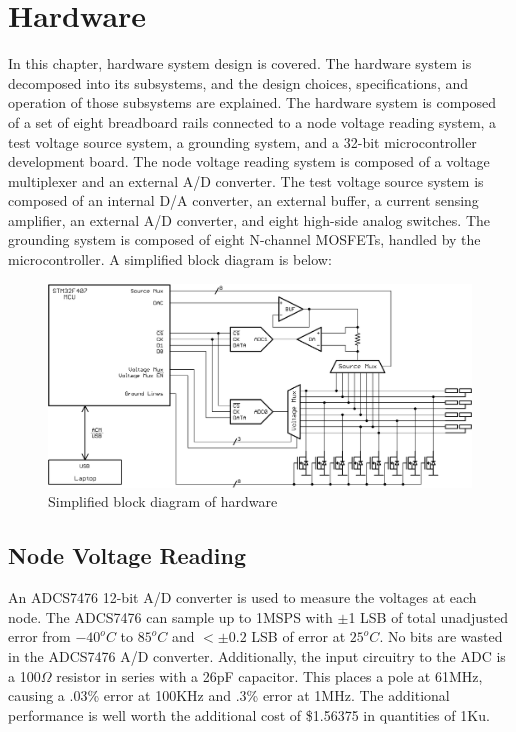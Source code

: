 \documentclass[11pt,twoside]{mitthesis}
\begin{document}
\fi


\chapter{Hardware}
In this chapter, hardware system design is covered.
The hardware system is decomposed into its subsystems, and the design choices, specifications, and operation of those subsystems are explained.
The hardware system is composed of a set of eight breadboard rails connected to a node voltage reading system, a test voltage source system, a grounding system, and a 32-bit microcontroller development board.
The node voltage reading system is composed of a voltage multiplexer and an external A/D converter.
The test voltage source system is composed of an internal D/A converter, an external buffer, a current sensing amplifier, an external A/D converter, and eight high-side analog switches.
The grounding system is composed of eight N-channel MOSFETs, handled by the microcontroller.
A simplified block diagram is below:
\begin{figure}[h]
  \begin{center}
      \includegraphics[width=.9\textwidth]{../circuit.png}
  \end{center}
  \caption{Simplified block diagram of hardware}
\end{figure}

\section{Node Voltage Reading}
An ADCS7476 12-bit A/D converter is used to measure the voltages at each node.
The ADCS7476 can sample up to 1MSPS with $\pm$1 LSB of total unadjusted error from $-40^o C$ to $85^o C$ and $<\pm 0.2$ LSB of error at $25^o C$.
No bits are wasted in the ADCS7476 A/D converter.
Additionally, the input circuitry to the ADC is a 100$\Omega$ resistor in series with a 26pF capacitor.  
This places a pole at 61MHz, causing a .03\% error at 100KHz and .3\% error at 1MHz.
The additional performance is well worth the additional cost of \$1.56375 in quantities of 1Ku.
\end{document}
